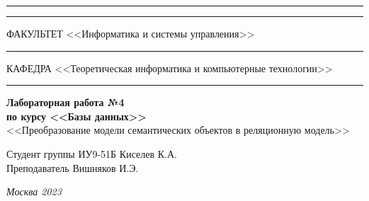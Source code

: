 \documentclass[a4paper, 14pt]{extarticle}
\begin{document}
\begin{titlepage}
\vspace{-25pt}
\hspace{-35pt}\rule{\textwidth}{2.3pt}

\vspace*{-20.3pt}
\hspace{-35pt}\rule{\textwidth}{0.4pt}

\vspace{1.5ex}
\hspace{-35pt} \noindent \small ФАКУЛЬТЕТ\hspace{80pt} <<Информатика и системы управления>>

\vspace*{-16pt}
\hspace{47pt}\rule{0.83\textwidth}{0.4pt}

\vspace{0.5ex}
\hspace{-35pt} \noindent \small КАФЕДРА\hspace{50pt} <<Теоретическая информатика и компьютерные технологии>>

\vspace*{-16pt}
\hspace{30pt}\rule{0.866\textwidth}{0.4pt}
  
\vspace{11em}

\begin{center}
\Large {\bf Лабораторная работа №4} \\ 
\large {\bf по курсу <<Базы данных>>} \\

\large <<Преобразование модели семантических объектов в реляционную модель>> \\
\end{center}\normalsize

\vspace{8em}


\begin{flushright}
  {Студент группы ИУ9-51Б Киселев К.А. \hspace*{15pt}\\ 
  \vspace{2ex}
  Преподаватель Вишняков И.Э. \hspace*{15pt}}
\end{flushright}

\bigskip

\vfill
 

\begin{center}
\textsl{Москва 2023}
\end{center}
\end{titlepage}
\end{document}
